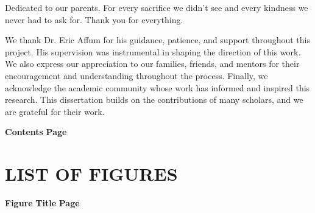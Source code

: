 \documentclass[12pt, onehalfspacing, liststotoc, oneside, parskip, headsepline,UKenglish]{UMaT_Undergrauate_Report_Template_Configurations}
\begin{document}
\begin{dedication}
  \vspace{10pt}
  \centering
  Dedicated to our parents. For every sacrifice we didn't see and every kindness we never had to ask for. Thank you for everything.
\end{dedication}


\begin{acknowledgements}
  \addchaptertocentry{\acknowledgementname}
  \vspace{0.5cm}
  We thank Dr. Eric Affum for his guidance, patience, and support throughout this project. His supervision was instrumental in shaping the direction of this work. We also express our appreciation to our families, friends, and mentors for their encouragement and understanding throughout the process. Finally, we acknowledge the academic community whose work has informed and inspired this research. This dissertation builds on the contributions of many scholars, and we are grateful for their work.
\end{acknowledgements}
\pagebreak

\vspace*{60pt}
\vspace{10pt}
\renewcommand{\contentsname}{\hfill\large\bfseries TABLE OF CONTENTS\hfill}
\vspace{-5ex}

\textbf{Contents} \hspace{0.84\textwidth} \textbf{Page}

\vspace*{-4cm}

\setlength{\cftsecindent}{0pt}
\setlength{\cftsubsecindent}{2.2em}
\tableofcontents
\pagebreak

\newpage
\makeatletter
\vspace{10pt}
\chapter*{\large\bfseries\centering\vspace{15pt} LIST OF FIGURES}
\vspace{-4ex}
\textbf{Figure} \hspace{0.4\textwidth} \textbf{Title} \hspace{0.4\textwidth} \textbf{Page}
\vspace{-3ex}
\makeatother
\clearpage
\end{document}

